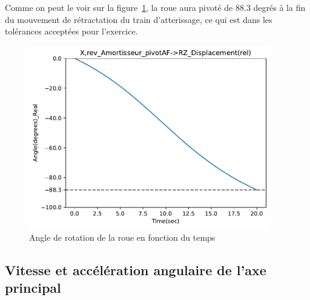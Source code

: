 \documentclass{article}
\begin{document}
Comme on peut le voir sur la figure~\ref{fig:wheel_rotation_angle}, la roue aura pivoté de 88.3 degrés à la fin du mouvement de rétractation du train d'atterissage, ce qui est dans les tolérances acceptées pour l'exercice.
\begin{figure}[h]
    \centering 
    \includegraphics[height=8cm]{data/displacement_angle_amortisseur.pdf}
    \caption{Angle de rotation de la roue en fonction du temps}
    \label{fig:wheel_rotation_angle}
\end{figure}

\pagebreak
\subsection{Vitesse et accélération angulaire de l'axe principal}
\end{document}
